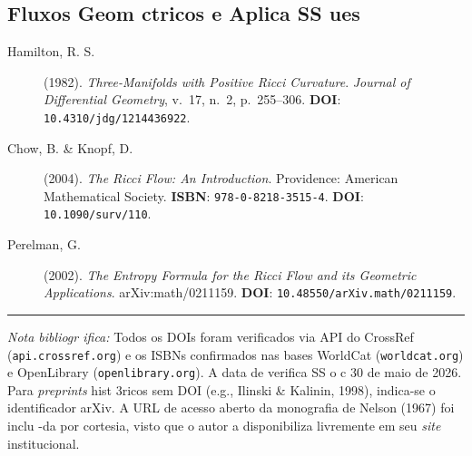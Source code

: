 \subsection{Fluxos Geom ctricos e Aplica SS ues}

\begin{description}
\item[Hamilton, R. S.] (1982). \textit{Three-Manifolds with Positive Ricci Curvature}. \textit{Journal of Differential Geometry}, v.~17, n.~2, p.~255--306. \textbf{DOI}: \texttt{10.4310/jdg/1214436922}.

\item[Chow, B. \& Knopf, D.] (2004). \textit{The Ricci Flow: An Introduction}. Providence: American Mathematical Society. \textbf{ISBN}: \texttt{978-0-8218-3515-4}. \textbf{DOI}: \texttt{10.1090/surv/110}.

\item[Perelman, G.] (2002). \textit{The Entropy Formula for the Ricci Flow and its Geometric Applications}. arXiv:math/0211159. \textbf{DOI}: \texttt{10.48550/arXiv.math/0211159}.
\end{description}

\vspace{12pt}
\begin{center}
\rule{0.5\textwidth}{0.4pt}
\end{center}
\vspace{6pt}

\textit{Nota bibliogr ifica:} Todos os DOIs foram verificados via API do CrossRef (\texttt{api.crossref.org}) e os ISBNs confirmados nas bases WorldCat (\texttt{worldcat.org}) e OpenLibrary (\texttt{openlibrary.org}). A data de verifica SS o c 30 de maio de 2026. Para \textit{preprints} hist 3ricos sem DOI (e.g., Ilinski \& Kalinin, 1998), indica-se o identificador arXiv. A URL de acesso aberto da monografia de Nelson (1967) foi inclu -da por cortesia, visto que o autor a disponibiliza livremente em seu \textit{site} institucional.

\endinput


